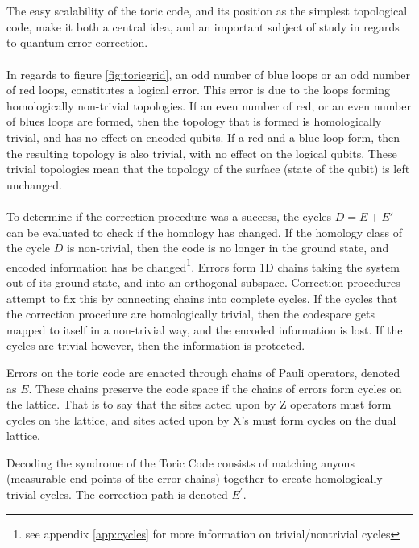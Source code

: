 \\\\
The easy scalability of the toric code, and its position as the simplest topological code, make it both a central idea, and an important subject of study in regards to quantum error correction.
\\\\
In regards to figure \ref{fig:toricgrid}, an odd number of blue loops or an odd number of red loops, constitutes a logical error. This error is due to the loops forming homologically non-trivial topologies. If an even number of red, or an even number of blues loops are formed, then the topology that is formed is homologically trivial, and has no effect on encoded qubits. If a red and a blue loop form, then the resulting topology is also trivial, with no effect on the logical qubits. These trivial topologies mean that the topology of the surface (state of the qubit) is left unchanged. 
\\\\
To determine if the correction procedure was a success, the cycles $D = E+E'$ can be evaluated to check if the homology has changed. If the homology class of the cycle $D$ is non-trivial, then the code is no longer in the ground state, and encoded information has be changed\footnote{see appendix \ref{app:cycles} for more information on trivial/nontrivial cycles}. Errors form 1D chains taking the system out of its ground state, and into an orthogonal subspace. Correction procedures attempt to fix this by connecting chains into complete cycles. If the cycles that the correction procedure are homologically trivial, then the codespace gets mapped to itself in a non-trivial way, and the encoded information is lost. If the cycles are trivial however, then the information is protected.

Errors on the toric code are enacted through chains of Pauli operators, denoted as $E$. These chains preserve the code space if the chains of errors form cycles on the lattice. That is to say that the sites acted upon by Z operators must form cycles on the lattice, and sites acted upon by X's must form cycles on the dual lattice. 

Decoding the syndrome of the Toric Code consists of matching anyons (measurable end points of the error chains) together to create homologically trivial cycles. The correction path is denoted $E^\prime$.


